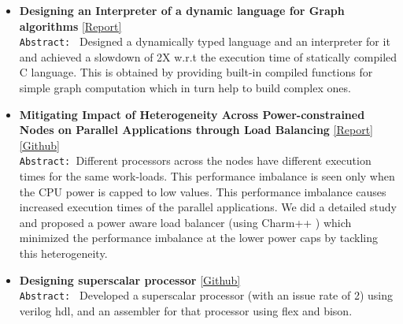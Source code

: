 \documentclass[9pt]{article}
\newenvironment{changemargin}[2]{%
  \begin{list}{}{%
    \setlength{\topsep}{0pt}%
    \setlength{\leftmargin}{#1}%
    \setlength{\rightmargin}{#2}%
    \setlength{\listparindent}{\parindent}%
    \setlength{\itemindent}{\parindent}%
    \setlength{\parsep}{\parskip}%
  }%
  \item[]}{\end{list}
}
\newenvironment{body} {
	\vspace*{-16pt}
	\begin{changemargin}{-0.25in}{-0.5in}
  }	
	{\end{changemargin}
}
\begin{document}
\begin{body}
\begin{itemize}
           \item \textbf{Designing an Interpreter of a dynamic language for Graph
algorithms}
           \href{http://webhost.engr.illinois.edu/~sdasgup3/Document/report_cs598dhp.pdf}{[Report]} \\
                                  \texttt{Abstract: } 
                                  Designed a dynamically typed language and an interpreter for it and 
                                  achieved a slowdown of 2X w.r.t the execution time of statically compiled C
                                  language. This is obtained by providing built-in compiled functions 
                                  for simple graph computation which in turn help to build complex
                                  ones.

          \item \textbf{Mitigating Impact of Heterogeneity Across Power-constrained Nodes on Parallel Applications through Load Balancing}     
                                \href{http://webhost.engr.illinois.edu/~sdasgup3/Document/report_cs533.pdf}{[Report]} 
                                \href{https://github.com/sdasgup3/heterogeneity-aware-load-balancing}{[Github]} \\
                                  \texttt{Abstract: }Different processors across the nodes
                                  have different execution times for the same
                                  work-loads. This performance imbalance is seen
                                  only when the CPU power is capped to low
                                  values. This performance imbalance causes
                                  increased execution times of the parallel
                                  applications. We did a detailed study and
                                  proposed a power aware load balancer (using
                                      Charm++ ) which minimized the performance
                                  imbalance at the lower power caps by tackling
                                  this heterogeneity.  
           \item \textbf{Designing superscalar processor} \href{https://github.com/sdasgup3/parallel-processor-design}{[Github]} \\
                                \texttt{Abstract: } Developed a superscalar processor (with  an
                                    issue rate of 2) using verilog hdl, and an
                                assembler for that processor using flex and
                                bison.  


\end{itemize}
\end{body}
\end{document}
